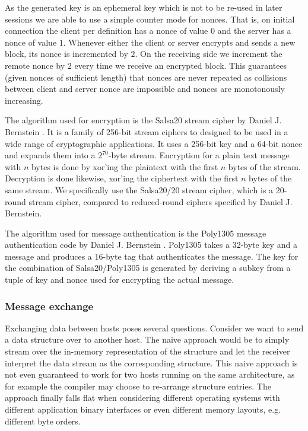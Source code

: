 As the generated key is an ephemeral key which is not to be re-used in later sessions we are able to use a simple counter mode for nonces.
That is, on initial connection the client per definition has a nonce of value $0$ and the server has a nonce of value $1$.
Whenever either the client or server encrypts and sends a new block, its nonce is incremented by $2$.
On the receiving side we increment the remote nonce by $2$ every time we receive an encrypted block.
This guarantees (given nonces of sufficient length) that nonces are never repeated as collisions between client and server nonce are impossible and nonces are monotonously increasing.

The algorithm used for encryption is the Salsa20 stream cipher by Daniel J. Bernstein \cite{bernstein2008salsa}.
It is a family of 256-bit stream ciphers to designed to be used in a wide range of cryptographic applications.
It uses a 256-bit key and a 64-bit nonce and expands them into a $2^{70}$-byte stream.
Encryption for a plain text message with $n$ bytes is done by xor'ing the plaintext with the first $n$ bytes of the stream.
Decryption is done likewise, xor'ing the ciphertext with the first $n$ bytes of the same stream.
We specifically use the Salsa20/20 stream cipher, which is a 20-round stream cipher, compared to reduced-round ciphers specified by Daniel J. Bernstein.

The algorithm used for message authentication is the Poly1305 message authentication code by Daniel J. Bernstein \cite{bernstein2005poly1305}.
Poly1305 takes a 32-byte key and a message and produces a 16-byte tag that authenticates the message.
The key for the combination of Salsa20/Poly1305 is generated by deriving a subkey from a tuple of key and nonce used for encrypting the actual message.

\subsubsection{Message exchange}

Exchanging data between hosts poses several questions.
Consider we want to send a data structure over to another host.
The naive approach would be to simply stream over the in-memory representation of the structure and let the receiver interpret the data stream as the corresponding structure.
This naive approach is not even guaranteed to work for two hosts running on the same architecture, as for example the compiler may choose to re-arrange structure entries.
The approach finally falls flat when considering different operating systems with different application binary interfaces or even different memory layouts, e.g. different byte orders.

